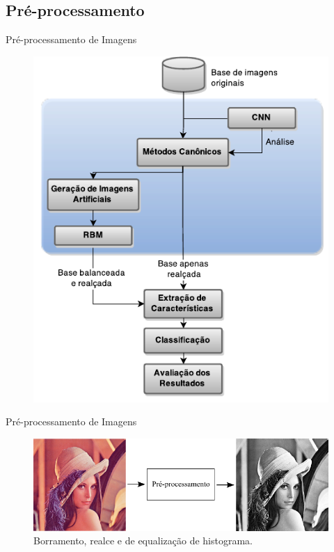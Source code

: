 \documentclass{beamer}
\begin{document}
\subsection{Pré-processamento}
\begin{frame}{Pré-processamento de Imagens}
\begin{figure}
    \includegraphics[height=0.75\textheight]{figuras/geral.pdf}
\end{figure}
\end{frame}
\begin{frame}{Pré-processamento de Imagens}
\begin{figure}[htbp]
 \begin{center}
   \includegraphics[width=1\linewidth]{figuras/preprocessamento.png}
 \caption{Borramento, realce e de equalização de histograma.}
 \end{center}
\end{figure}
\end{frame}
\end{document}
